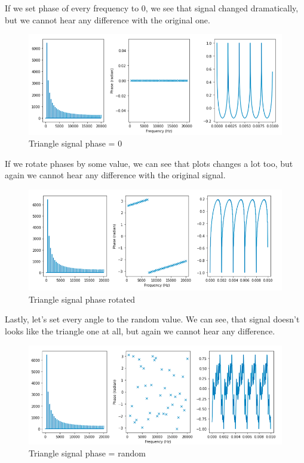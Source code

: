 \documentclass[a4paper]{article}
\begin{document}
        If we set phase of every frequency to 0, we see that signal changed dramatically, but we cannot hear any difference with the original one.
        
        \begin{figure}[H]
            \centering
            \includegraphics[width=\textwidth]{img/ph3.png}
            \caption{Triangle signal phase = 0}
            \label{fig:als_clr}
        \end{figure}
            
        If we rotate phases by some value, we can see that plots changes a lot too, but again we cannot hear any difference with the original signal.
        
        \begin{figure}[H]
            \centering
            \includegraphics[width=\textwidth]{img/ph4.png}
            \caption{Triangle signal phase rotated}
            \label{fig:als_clr}
        \end{figure}
            
        Lastly, let's set every angle to the random value. We can see, that signal doesn't looks like the triangle one at all, but again we cannot hear any difference.
        
        \begin{figure}[H]
            \centering
            \includegraphics[width=\textwidth]{img/ph5.png}
            \caption{Triangle signal phase = random}
            \label{fig:als_clr}
        \end{figure}
        
\end{document}
